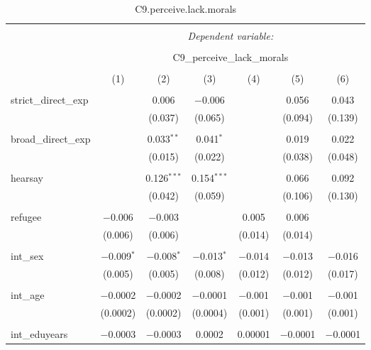 
\begin{table}[H] \centering 
  \caption{C9.perceive.lack.morals} 
  \label{} 
\tiny 
\begin{tabular}{@{\extracolsep{4pt}}lcccccc} 
\\[-1.8ex]\hline 
\hline \\[-1.8ex] 
 & \multicolumn{6}{c}{\textit{Dependent variable:}} \\ 
\cline{2-7} 
\\[-1.8ex] & \multicolumn{6}{c}{C9\_perceive\_lack\_morals} \\ 
\\[-1.8ex] & (1) & (2) & (3) & (4) & (5) & (6)\\ 
\hline \\[-1.8ex] 
 strict\_direct\_exp &  & 0.006 & $-$0.006 &  & 0.056 & 0.043 \\ 
  &  & (0.037) & (0.065) &  & (0.094) & (0.139) \\ 
  & & & & & & \\ 
 broad\_direct\_exp &  & 0.033$^{**}$ & 0.041$^{*}$ &  & 0.019 & 0.022 \\ 
  &  & (0.015) & (0.022) &  & (0.038) & (0.048) \\ 
  & & & & & & \\ 
 hearsay &  & 0.126$^{***}$ & 0.154$^{***}$ &  & 0.066 & 0.092 \\ 
  &  & (0.042) & (0.059) &  & (0.106) & (0.130) \\ 
  & & & & & & \\ 
 refugee & $-$0.006 & $-$0.003 &  & 0.005 & 0.006 &  \\ 
  & (0.006) & (0.006) &  & (0.014) & (0.014) &  \\ 
  & & & & & & \\ 
 int\_sex & $-$0.009$^{*}$ & $-$0.008$^{*}$ & $-$0.013$^{*}$ & $-$0.014 & $-$0.013 & $-$0.016 \\ 
  & (0.005) & (0.005) & (0.008) & (0.012) & (0.012) & (0.017) \\ 
  & & & & & & \\ 
 int\_age & $-$0.0002 & $-$0.0002 & $-$0.0001 & $-$0.001 & $-$0.001 & $-$0.001 \\ 
  & (0.0002) & (0.0002) & (0.0004) & (0.001) & (0.001) & (0.001) \\ 
  & & & & & & \\ 
 int\_eduyears & $-$0.0003 & $-$0.0003 & 0.0002 & 0.00001 & $-$0.0001 & $-$0.0001 \\ 

\end{tabular}
\end{table}
